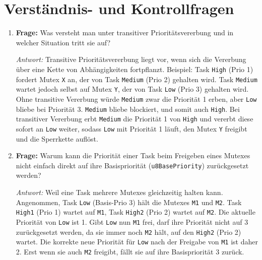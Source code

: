 \section{Verständnis- und Kontrollfragen}
\begin{enumerate}
    \item \textbf{Frage:} Was versteht man unter transitiver Prioritätsvererbung und in welcher Situation tritt sie auf?
    
    \textit{Antwort:} Transitive Prioritätsvererbung liegt vor, wenn sich die Vererbung über eine Kette von Abhängigkeiten fortpflanzt. Beispiel: Task \lstinline|High| (Prio 1) fordert Mutex \lstinline|X| an, der von Task \lstinline|Medium| (Prio 2) gehalten wird. Task \lstinline|Medium| wartet jedoch selbst auf Mutex \lstinline|Y|, der von Task \lstinline|Low| (Prio 3) gehalten wird. Ohne transitive Vererbung würde \lstinline|Medium| zwar die Priorität 1 erben, aber \lstinline|Low| bliebe bei Priorität 3. \lstinline|Medium| bliebe blockiert, und somit auch \lstinline|High|. Bei transitiver Vererbung erbt \lstinline|Medium| die Priorität 1 von \lstinline|High| und vererbt diese sofort an \lstinline|Low| weiter, sodass \lstinline|Low| mit Priorität 1 läuft, den Mutex \lstinline|Y| freigibt und die Sperrkette auflöst.
    
    \item \textbf{Frage:} Warum kann die Priorität einer Task beim Freigeben eines Mutexes nicht einfach direkt auf ihre Basispriorität (\lstinline|u8BasePriority|) zurückgesetzt werden?
    
    \textit{Antwort:} Weil eine Task mehrere Mutexes gleichzeitig halten kann. Angenommen, Task \lstinline|Low| (Basis-Prio 3) hält die Mutexes \lstinline|M1| und \lstinline|M2|. Task \lstinline|High1| (Prio 1) wartet auf \lstinline|M1|, Task \lstinline|High2| (Prio 2) wartet auf \lstinline|M2|. Die aktuelle Priorität von \lstinline|Low| ist 1. Gibt \lstinline|Low| nun \lstinline|M1| frei, darf ihre Priorität nicht auf 3 zurückgesetzt werden, da sie immer noch \lstinline|M2| hält, auf den \lstinline|High2| (Prio 2) wartet. Die korrekte neue Priorität für \lstinline|Low| nach der Freigabe von \lstinline|M1| ist daher 2. Erst wenn sie auch \lstinline|M2| freigibt, fällt sie auf ihre Basispriorität 3 zurück.
\end{enumerate}

